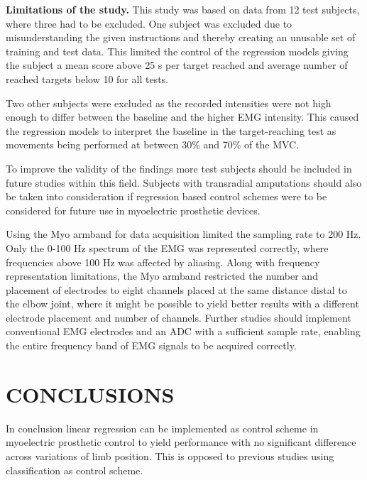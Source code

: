 \documentclass[a4paper, 10pt, conference]{ieeeconf}      %
\begin{document}
\begin{multicol}{2}
\textbf{Limitations of the study.}
This study was based on data from 12 test subjects, where three had to be excluded. One subject was excluded due to misunderstanding the given instructions and thereby creating an unusable set of training and test data. This limited the control of the regression models giving the subject a mean score above 25 s per target reached and average number of reached targets below 10 for all tests.

Two other subjects were excluded as the recorded intensities were not high enough to differ between the baseline and the higher EMG intensity. This caused the regression models to interpret the baseline in the target-reaching test as movements being performed at between 30\% and 70\% of the MVC. 

To improve the validity of the findings more test subjects should be included in future studies within this field. Subjects with transradial amputations should also be taken into consideration if regression based control schemes were to be considered for future use in myoelectric prosthetic devices. 

Using the Myo armband for data acquisition limited the sampling rate to 200 Hz. Only the 0-100 Hz spectrum of the EMG was represented correctly, where frequencies above 100 Hz was affected by aliasing. Along with frequency representation limitations, the Myo armband restricted the number and placement of electrodes to eight channels placed at the same distance distal to the elbow joint, where it might be possible to yield better results with a different electrode placement and number of channels. Further studies should implement conventional EMG electrodes and an ADC with a sufficient sample rate, enabling the entire frequency band of EMG signals to be acquired correctly.		
	
\section{CONCLUSIONS}%
	
% 		
In conclusion linear regression can be implemented as control scheme in myoelectric prosthetic control to yield performance with no significant difference across variations of limb position. This is opposed to previous studies using classification as control scheme.
 		
	
	

\end{multicol}
\end{document}
